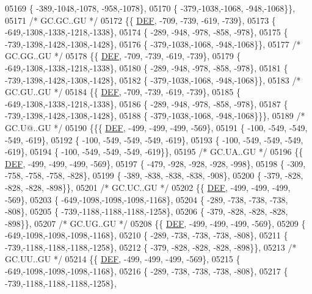 \begin{DoxyCode}
05169 \{ -389,-1048,-1078, -958,-1078\},
05170 \{ -379,-1038,-1068, -948,-1068\}\},
05171 \textcolor{comment}{/* GC.GC..GU */}
05172 \{\{  \mbox{\hyperlink{1_88_84__epars_8h_a397419fc12b37ed479c8abb9d444d843}{DEF}}, -709, -739, -619, -739\},
05173 \{ -649,-1308,-1338,-1218,-1338\},
05174 \{ -289, -948, -978, -858, -978\},
05175 \{ -739,-1398,-1428,-1308,-1428\},
05176 \{ -379,-1038,-1068, -948,-1068\}\},
05177 \textcolor{comment}{/* GC.GG..GU */}
05178 \{\{  \mbox{\hyperlink{1_88_84__epars_8h_a397419fc12b37ed479c8abb9d444d843}{DEF}}, -709, -739, -619, -739\},
05179 \{ -649,-1308,-1338,-1218,-1338\},
05180 \{ -289, -948, -978, -858, -978\},
05181 \{ -739,-1398,-1428,-1308,-1428\},
05182 \{ -379,-1038,-1068, -948,-1068\}\},
05183 \textcolor{comment}{/* GC.GU..GU */}
05184 \{\{  \mbox{\hyperlink{1_88_84__epars_8h_a397419fc12b37ed479c8abb9d444d843}{DEF}}, -709, -739, -619, -739\},
05185 \{ -649,-1308,-1338,-1218,-1338\},
05186 \{ -289, -948, -978, -858, -978\},
05187 \{ -739,-1398,-1428,-1308,-1428\},
05188 \{ -379,-1038,-1068, -948,-1068\}\}\},
05189 \textcolor{comment}{/* GC.U@..GU */}
05190 \{\{\{  \mbox{\hyperlink{1_88_84__epars_8h_a397419fc12b37ed479c8abb9d444d843}{DEF}}, -499, -499, -499, -569\},
05191 \{ -100, -549, -549, -549, -619\},
05192 \{ -100, -549, -549, -549, -619\},
05193 \{ -100, -549, -549, -549, -619\},
05194 \{ -100, -549, -549, -549, -619\}\},
05195 \textcolor{comment}{/* GC.UA..GU */}
05196 \{\{  \mbox{\hyperlink{1_88_84__epars_8h_a397419fc12b37ed479c8abb9d444d843}{DEF}}, -499, -499, -499, -569\},
05197 \{ -479, -928, -928, -928, -998\},
05198 \{ -309, -758, -758, -758, -828\},
05199 \{ -389, -838, -838, -838, -908\},
05200 \{ -379, -828, -828, -828, -898\}\},
05201 \textcolor{comment}{/* GC.UC..GU */}
05202 \{\{  \mbox{\hyperlink{1_88_84__epars_8h_a397419fc12b37ed479c8abb9d444d843}{DEF}}, -499, -499, -499, -569\},
05203 \{ -649,-1098,-1098,-1098,-1168\},
05204 \{ -289, -738, -738, -738, -808\},
05205 \{ -739,-1188,-1188,-1188,-1258\},
05206 \{ -379, -828, -828, -828, -898\}\},
05207 \textcolor{comment}{/* GC.UG..GU */}
05208 \{\{  \mbox{\hyperlink{1_88_84__epars_8h_a397419fc12b37ed479c8abb9d444d843}{DEF}}, -499, -499, -499, -569\},
05209 \{ -649,-1098,-1098,-1098,-1168\},
05210 \{ -289, -738, -738, -738, -808\},
05211 \{ -739,-1188,-1188,-1188,-1258\},
05212 \{ -379, -828, -828, -828, -898\}\},
05213 \textcolor{comment}{/* GC.UU..GU */}
05214 \{\{  \mbox{\hyperlink{1_88_84__epars_8h_a397419fc12b37ed479c8abb9d444d843}{DEF}}, -499, -499, -499, -569\},
05215 \{ -649,-1098,-1098,-1098,-1168\},
05216 \{ -289, -738, -738, -738, -808\},
05217 \{ -739,-1188,-1188,-1188,-1258\},

\end{DoxyCode}
